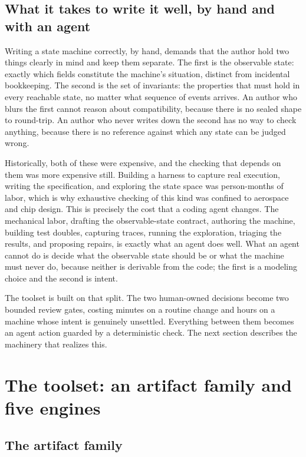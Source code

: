 \documentclass[11pt]{article}
\begin{document}
\subsection{What it takes to write it well, by hand and with an agent}

Writing a state machine correctly, by hand, demands that the author hold two
things clearly in mind and keep them separate. The first is the observable
state: exactly which fields constitute the machine's situation, distinct from
incidental bookkeeping. The second is the set of invariants: the properties
that must hold in every reachable state, no matter what sequence of events
arrives. An author who blurs the first cannot reason about compatibility,
because there is no sealed shape to round-trip. An author who never writes down
the second has no way to check anything, because there is no reference against
which any state can be judged wrong.

Historically, both of these were expensive, and the checking that depends on
them was more expensive still. Building a harness to capture real execution,
writing the specification, and exploring the state space was person-months of
labor, which is why exhaustive checking of this kind was confined to aerospace
and chip design. This is precisely the cost that a coding agent changes. The
mechanical labor, drafting the observable-state contract, authoring the
machine, building test doubles, capturing traces, running the exploration,
triaging the results, and proposing repairs, is exactly what an agent does
well. What an agent cannot do is decide what the observable state should be or
what the machine must never do, because neither is derivable from the code; the
first is a modeling choice and the second is intent.

The toolset is built on that split. The two human-owned decisions become two
bounded review gates, costing minutes on a routine change and hours on a machine
whose intent is genuinely unsettled. Everything between them becomes an agent
action guarded by a deterministic check. The next section describes the
machinery that realizes this.

\section{The toolset: an artifact family and five engines}

\subsection{The artifact family}
\end{document}
